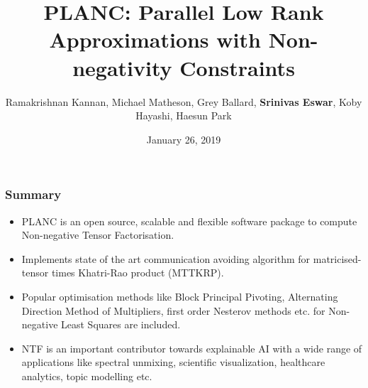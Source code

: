 \documentclass{beamer}
\title[PLANC]{PLANC: Parallel Low Rank Approximations with Non-negativity Constraints} %
\author[Srinivas Eswar]{Ramakrishnan Kannan, Michael Matheson, Grey Ballard, \textbf{Srinivas Eswar}, Koby Hayashi, Haesun Park} %
\institute[GT] %
{
Ph.D student, School of CSE \\
Georgia Institute of Technology \\ %
\medskip
Advisors: Rich Vuduc and Haesun Park
}
\date{January 26, 2019} %
\begin{document}
\begin{frame}
\titlepage %
\end{frame}




\begin{frame}[label=summary]
\frametitle{Summary}
\begin{itemize}
\item PLANC is an open source, scalable and flexible software package to compute Non-negative Tensor Factorisation.
\pause
\item Implements state of the art communication avoiding algorithm for matricised-tensor times Khatri-Rao product (MTTKRP).
\pause
\item Popular optimisation methods like Block Principal Pivoting, Alternating Direction Method of Multipliers, first order Nesterov methods etc. for Non-negative Least Squares are included. 
\pause
\item NTF is an important contributor towards explainable AI with a wide range of applications like spectral unmixing, scientific visualization, healthcare analytics, topic modelling etc.
\end{itemize}
\end{frame}
\end{document}
